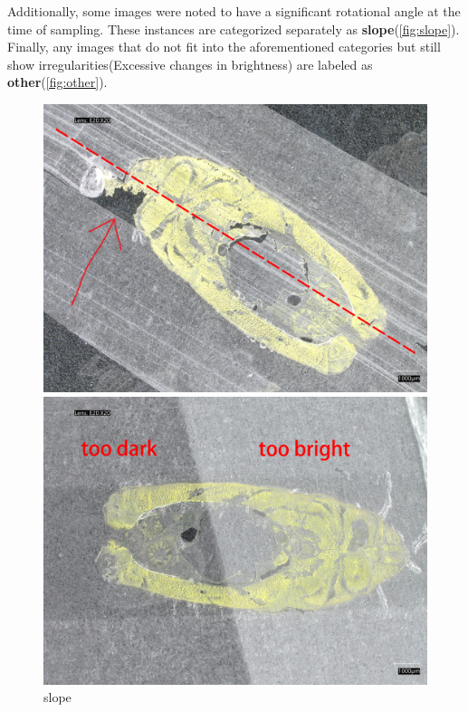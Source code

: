 Additionally, some images were noted to have a significant rotational angle at the time of sampling. These instances are categorized separately as \textbf{slope}(\autoref{fig:slope}). Finally, any images that do not fit into the aforementioned categories but still show irregularities(Excessive changes in brightness) are labeled as \textbf{other}(\autoref{fig:other}). 

\begin{figure}[H]
    \centering
    \begin{minipage}{0.32\textwidth}
        \centering
        \includegraphics[width=\textwidth]{./fig/sample_1/slope - 副本.jpg}
        \caption{slope}
        \label{fig:slope}
    \end{minipage}
    \begin{minipage}{0.32\textwidth}
        \centering
        \includegraphics[width=\textwidth]{./fig/sample_1/other - 副本.jpg}

\end{minipage}
\end{figure}

